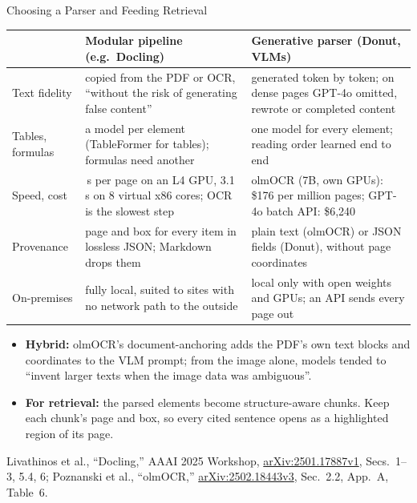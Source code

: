 \begin{frame}{Choosing a Parser and Feeding Retrieval}

  {\centering\scriptsize
  \begin{tabular}{>{\raggedright\arraybackslash}p{1.9cm} >{\raggedright\arraybackslash}p{4.9cm} >{\raggedright\arraybackslash}p{5.1cm}}
    \toprule
     & \textbf{Modular pipeline} (e.g.\ Docling) & \textbf{Generative parser} (Donut, VLMs) \\
    \midrule
    Text fidelity & copied from the PDF or OCR, ``without the risk of generating false content'' & generated token by token; on dense pages GPT-4o omitted, rewrote or completed content \\
    \addlinespace[0.15em]
    Tables, formulas & a model per element (TableFormer for tables); formulas need another & one model for every element; reading order learned end to end \\
    \addlinespace[0.15em]
    Speed, cost & 0.48\,s per page on an L4 GPU, 3.1\,s on 8 virtual x86 cores; OCR is the slowest step & olmOCR (7B, own GPUs): \$176 per million pages; GPT-4o batch API: \$6{,}240 \\
    \addlinespace[0.15em]
    Provenance & page and box for every item in lossless JSON; Markdown drops them & plain text (olmOCR) or JSON fields (Donut), without page coordinates \\
    \addlinespace[0.15em]
    On-premises & fully local, suited to sites with no network path to the outside & local only with open weights and GPUs; an API sends every page out \\
    \bottomrule
  \end{tabular}\par}
  \vspace{0.3em}
  \begin{itemize}\footnotesize\itemsep0.3em
    \item[\textcolor{red}{$\blacktriangleright$}] \textbf{Hybrid:} olmOCR's document-anchoring adds the PDF's own text blocks and coordinates to the VLM prompt; from the image alone, models tended to ``invent larger texts when the image data was ambiguous''.
    \item[\textcolor{red}{$\blacktriangleright$}] \textbf{For retrieval:} the parsed elements become structure-aware chunks. Keep each chunk's page and box, so every cited sentence opens as a highlighted region of its page.
  \end{itemize}
  \vspace{0.1em}
  {\scriptsize Livathinos et al., ``Docling,'' AAAI 2025 Workshop, \href{https://arxiv.org/abs/2501.17887v1}{arXiv:2501.17887v1}, Secs.~1--3, 5.4, 6; Poznanski et al., ``olmOCR,'' \href{https://arxiv.org/abs/2502.18443v3}{arXiv:2502.18443v3}, Sec.~2.2, App.~A, Table~6.\par}
\end{frame}

